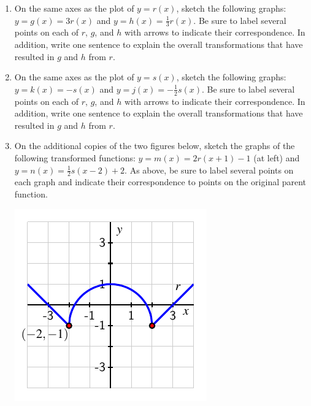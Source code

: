 \documentclass[handout, noauthor, nooutcomes]{ximera}
\begin{document}
\begin{exploration}
\begin{enumerate}[label=\alph*.]
\item
On the same axes as the plot of \(y = r(x)\), sketch the following graphs:  \(y = g(x) = 3r(x)\) and \(y = h(x) = \frac{1}{3}r(x)\).  Be sure to label several points on each of \(r\), \(g\), and \(h\) with arrows to indicate their correspondence.  In addition, write one sentence to explain the overall transformations that have resulted in \(g\) and \(h\) from \(r\).%
\item
On the same axes as the plot of \(y = s(x)\), sketch the following graphs:  \(y = k(x) = -s(x)\) and \(y = j(x) = -\frac{1}{2}s(x)\).  Be sure to label several points on each of \(r\), \(g\), and \(h\) with arrows to indicate their correspondence.  In addition, write one sentence to explain the overall transformations that have resulted in \(g\) and \(h\) from \(r\).%
\item On the additional copies of the two figures below, sketch the graphs of the following transformed functions:  \(y = m(x) = 2r(x+1)-1\) (at left) and \(y = n(x) = \frac{1}{2}s(x-2)+2\).  As above, be sure to label several points on each graph and indicate their correspondence to points on the original parent function.%
\begin{image}
\includegraphics[width=1\linewidth]{images/transformations-act-r-translation}


\end{image}
\end{enumerate}
\end{exploration}
\end{document}
